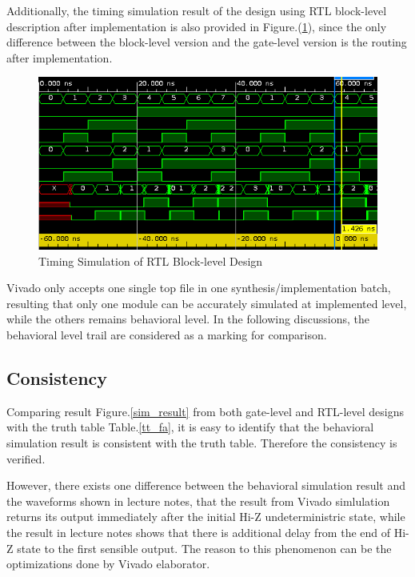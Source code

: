 \documentclass[conference]{IEEEtran}
\begin{document}
Additionally, the timing simulation result of the design using RTL block-level description after implementation is also provided in Figure.(\ref{sim_impl_rtlblk}), since the only difference between the block-level version and the gate-level version is the routing after implementation.

\begin{figure}[htpb]
	\begin{center}
		\includegraphics[width=0.97\linewidth]{report_lab2.assets/20240307190951.png}
		\caption{Timing Simulation of RTL Block-level Design}
		\label{sim_impl_rtlblk}
	\end{center}
\end{figure}

Vivado only accepts one single top file in one synthesis/implementation batch, resulting that only one module can be accurately simulated at implemented level, while the others remains behavioral level. In the following discussions, the behavioral level trail are considered as a marking for comparison.

\subsection{Consistency}

Comparing result Figure.\ref{sim_result} from both gate-level and RTL-level designs with the truth table Table.\ref{tt_fa}, it is easy to identify that the behavioral simulation result is consistent with the truth table. Therefore the consistency is verified.

However, there exists one difference between the behavioral simulation result and the waveforms shown in lecture notes, that the result from Vivado simlulation returns its output immediately after the initial Hi-Z undeterministric state, while the result in lecture notes shows that there is additional delay from the end of Hi-Z state to the first sensible output. The reason to this phenomenon can be the optimizations done by Vivado elaborator.
\end{document}
